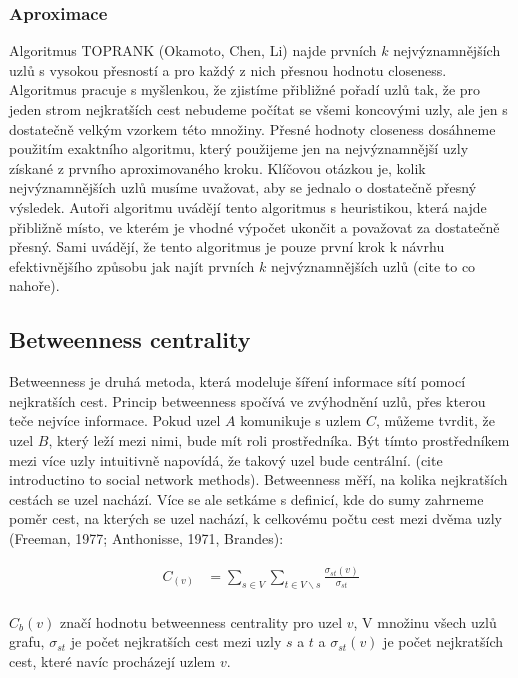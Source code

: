 \documentclass[12pt,titlepage]{report}
\begin{document}
\subsubsection{Aproximace}
Algoritmus TOPRANK (Okamoto, Chen, Li) najde prvních $k$ nejvýznamnějších uzlů
s vysokou přesností a pro každý z nich přesnou hodnotu closeness.  Algoritmus
pracuje s myšlenkou, že zjistíme přibližné pořadí uzlů tak, že pro jeden strom
nejkratších cest nebudeme počítat se všemi koncovými uzly, ale jen s dostatečně
velkým vzorkem této množiny.  Přesné hodnoty closeness dosáhneme použitím
exaktního algoritmu, který použijeme jen na nejvýznamnější uzly získané z
prvního aproximovaného kroku. Klíčovou otázkou je, kolik nejvýznamnějších uzlů
musíme uvažovat, aby se jednalo o dostatečně přesný výsledek. Autoři algoritmu
uvádějí tento algoritmus s heuristikou, která najde přibližně místo, ve kterém
je vhodné výpočet ukončit a považovat za dostatečně přesný. Sami uvádějí, že
tento algoritmus je pouze první krok k návrhu efektivnějšího způsobu jak najít
prvních $k$ nejvýznamnějších uzlů (cite to co nahoře).

\subsection{Betweenness centrality}
Betweenness je druhá metoda, která modeluje šíření informace sítí pomocí
nejkratších cest. Princip betweenness spočívá ve zvýhodnění uzlů, přes kterou
teče nejvíce informace. Pokud uzel $A$ komunikuje s uzlem $C$, můžeme tvrdit,
že uzel $B$, který leží mezi nimi, bude mít roli prostředníka. Být tímto
prostředníkem mezi více uzly intuitivně napovídá, že takový uzel bude
centrální.  (cite introductino to social network methods). Betweenness
měří, na kolika nejkratších cestách se uzel nachází. Více se ale setkáme s
definicí, kde do sumy zahrneme poměr cest, na kterých se uzel nachází, k
celkovému počtu cest mezi dvěma uzly (Freeman, 1977; Anthonisse, 1971,
Brandes):

\begin{align*}
C_(v) &= \displaystyle\sum\limits_{s \in V} \displaystyle\sum\limits_{t \in V \backslash s} \frac{\sigma_{st}(v)}{\sigma_{st}} \\
\end{align*}

$C_b(v)$ značí hodnotu betweenness centrality pro uzel $v$, V množinu všech
uzlů grafu, $\sigma_{st}$ je počet nejkratších cest mezi uzly $s$ a $t$ a
$\sigma_{st}(v)$ je počet nejkratších cest, které navíc procházejí uzlem $v$.
\end{document}
